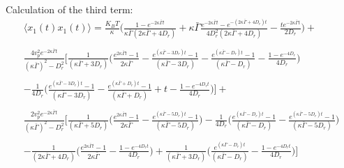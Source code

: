 \documentclass[]{article}
\begin{document}
Calculation of the third term:
\newline
\begin{multline*}
\langle x_{1}(t)x_{1}(t) \rangle =\frac{K_BT }{\kappa}\bigg(\frac{1-e^{-2\kappa \bar \Gamma t}}{\kappa \bar \Gamma(2\kappa \bar \Gamma+4D_r)}+\kappa \bar \Gamma \frac{e^{-2\kappa \bar \Gamma t}-e^{-(2\kappa \bar \Gamma+4D_r)t}}{4D_r^2(2\kappa \bar \Gamma+4D_r)}-\frac{te^{-2\kappa \bar\Gamma t}}{2D_r}\bigg)+\\ \\\frac{4v_p^2 e^{-2\kappa \bar \Gamma t}}{(\kappa \bar\Gamma)^2 -D_r^2}\bigg[\frac{1}{(\kappa \bar\Gamma +3D_r)}\bigg(\frac{e^{2\kappa \bar\Gamma t}-1}{2\kappa \bar\Gamma}-\frac{e^{(\kappa \bar\Gamma -3D_r)t}-1}{(\kappa \bar\Gamma -3D_r)}-\frac{e^{(\kappa \bar\Gamma -D_r)t}-1}{(\kappa \bar\Gamma -D_r)}-\frac{1-e^{-4D_r }}{4D_r} \bigg)\\ \\-\frac{1}{4D_r}\bigg(\frac{e^{(\kappa \bar\Gamma -3D_r)t}-1}{(\kappa \bar\Gamma -3D_r)}-\frac{e^{(\kappa \bar\Gamma +D_r)t}-1}{(\kappa \bar\Gamma +D_r)}+t-\frac{1-e^{-4D_rt}}{4D_r}\bigg) \bigg]+
\\ \\ \frac{2v_p^2 e^{-2\kappa \bar \Gamma t}}{(\kappa \bar\Gamma)^2 -D_r^2}\bigg[
\frac{1}{(\kappa \bar\Gamma +5D_r)} \bigg(\frac{e^{2\kappa \bar\Gamma t}-1}{2\kappa \bar\Gamma}-\frac{e^{(\kappa \bar\Gamma -5D_r)t}-1}{(\kappa \bar\Gamma -5D_r)} \bigg)-\frac{1}{4D_r}\bigg(\frac{e^{(\kappa \bar\Gamma -D_r)t}-1}{(\kappa \bar\Gamma -D_r)}-\frac{e^{(\kappa \bar\Gamma -5D_r)t}-1}{(\kappa \bar\Gamma -5D_r)}\bigg)\\ \\ -\frac{1}{(2\kappa \bar\Gamma +4D_r)}\bigg(\frac{ e^{2\kappa \bar\Gamma t}-1}{2\kappa \bar\Gamma}-\frac{1-e^{-4D_r t}}{4D_r}\bigg)+\frac{1}{(\kappa \bar\Gamma +3D_r)}\bigg(\frac{e^{(\kappa \bar\Gamma-D_r) t}}{(\kappa \bar\Gamma-D_r)}-\frac{1-e^{-4D_r t}}{4D_r}\bigg)\bigg]
\end{multline*}
\newline
\end{document}
